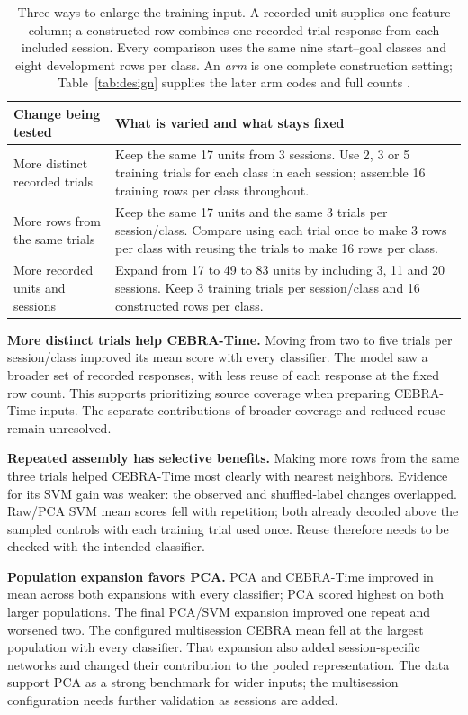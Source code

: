 \documentclass[10pt,a4paper]{article}
\begin{document}
\begin{table}[h!]
\caption{Three ways to enlarge the training input. A recorded unit supplies one feature column; a constructed row combines one recorded trial response from each included session. Every comparison uses the same nine start--goal classes and eight development rows per class. An \emph{arm} is one complete construction setting; Table~\ref{tab:design} supplies the later arm codes and full counts \cite{latest,reproduction}.}
\label{tab:choices}\small
\begin{tabularx}{\linewidth}{L{37mm}Y}
\toprule
Change being tested & What is varied and what stays fixed \\
\midrule
More distinct recorded trials & Keep the same 17 units from 3 sessions. Use 2, 3 or 5 training trials for each class in each session; assemble 16 training rows per class throughout. \\
More rows from the same trials & Keep the same 17 units and the same 3 trials per session/class. Compare using each trial once to make 3 rows per class with reusing the trials to make 16 rows per class. \\
More recorded units and sessions & Expand from 17 to 49 to 83 units by including 3, 11 and 20 sessions. Keep 3 training trials per session/class and 16 constructed rows per class. \\
\bottomrule
\end{tabularx}
\end{table}

\textbf{More distinct trials help CEBRA-Time.} Moving from two to five trials per session/class improved its mean score with every classifier. The model saw a broader set of recorded responses, with less reuse of each response at the fixed row count. This supports prioritizing source coverage when preparing CEBRA-Time inputs. The separate contributions of broader coverage and reduced reuse remain unresolved.

\textbf{Repeated assembly has selective benefits.} Making more rows from the same three trials helped CEBRA-Time most clearly with nearest neighbors. Evidence for its SVM gain was weaker: the observed and shuffled-label changes overlapped. Raw/PCA SVM mean scores fell with repetition; both already decoded above the sampled controls with each training trial used once. Reuse therefore needs to be checked with the intended classifier.

\textbf{Population expansion favors PCA.} PCA and CEBRA-Time improved in mean across both expansions with every classifier; PCA scored highest on both larger populations. The final PCA/SVM expansion improved one repeat and worsened two. The configured multisession CEBRA mean fell at the largest population with every classifier. That expansion also added session-specific networks and changed their contribution to the pooled representation. The data support PCA as a strong benchmark for wider inputs; the multisession configuration needs further validation as sessions are added.
\end{document}
